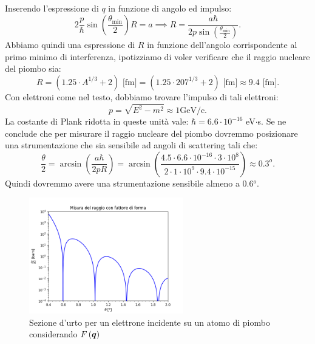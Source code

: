 Inserendo l'espressione di $q$ in funzione di angolo ed impulso:
\[
	2 \frac{p}{\hbar} \sin\left( \frac{\theta_{\text{min}}}{2} \right) R = a \implies R = \frac{a \hbar}{2 p \sin\left( \frac{\theta_{\text{min}}}{2} \right) } 
.\] 
Abbiamo quindi una espressione di $R$ in funzione dell'angolo corrispondente al primo minimo di interferenza, ipotizziamo di voler verificare che il raggio nucleare del piombo sia:
\[
	R = \left( 1.25\cdot A^{1 /3} + 2 \right)\text{ [fm]} = \left(1.25\cdot 207^{1 /3} + 2 \right)\text{ [fm]} \approx 9.4 \text{ [fm]}  
.\] 
Con elettroni come nel testo, dobbiamo trovare l'impulso di tali elettroni:
\[
	p = \sqrt{E^2-m^2} \approx 1 \text{GeV/c}	
.\] 
La costante di Plank ridotta in queste unità vale: $\hbar = 6.6 \cdot 10^{-16}$ eV$\cdot$s. Se ne conclude che per misurare il raggio nucleare del piombo dovremmo posizionare una strumentazione che sia sensibile ad angoli di scattering tali che:
\[
\frac{\theta}{2} = \arcsin \left(\frac{a \hbar}{2pR}\right) = \arcsin \left( \frac{4.5\cdot 6.6 \cdot 10^{-16}\cdot 3 \cdot 10^{8} }{2\cdot 1\cdot 10^{9}\cdot 9.4 \cdot 10^{-15}}\right) \approx 0.3^o
 .\]
 Quindi dovremmo avere una strumentazione sensibile almeno a 0.6$^o$. 
 \begin{figure}[H]
 	\centering
 	\includegraphics[width=0.6\textwidth]{immagini/misura-raggio-piombo.png}
	\caption{Sezione d'urto per un elettrone incidente su un atomo di piombo considerando $F\left( \boldsymbol{q} \right) $}
 	\label{fig:immagini-misura-raggio-piombo-png}
 \end{figure}
